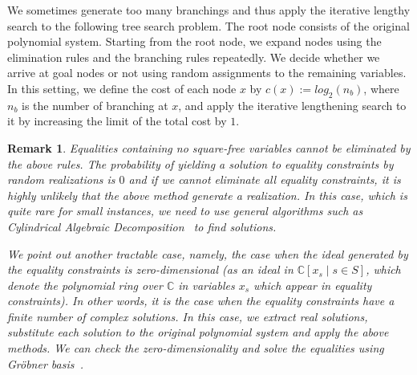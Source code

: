 \documentclass{article}
\newtheorem{remark}[thm]{\bfseries Remark}    %
\begin{document}



We sometimes generate too many branchings and
thus apply the iterative lengthy search to the following tree search problem.
The root node consists of the original polynomial system.
Starting from the root node, we expand nodes using the elimination rules and the branching rules repeatedly.
We decide whether we arrive at goal nodes or not using random assignments to the remaining variables.
In this setting, we define the cost of each node $x$ by $c(x):=log_{2}(n_b)$, where $n_b$ is the number of branching
at $x$, and apply the iterative lengthening search to it by increasing the limit of the total cost by $1$.
\begin{remark}
Equalities containing no square-free variables cannot be eliminated by the above rules.
The probability of yielding a solution to equality constraints by random realizations
is $0$ and if we cannot eliminate all equality constraints, it is highly unlikely 
that the above method generate a realization.
In this case, which is quite rare for small instances,
we need to use general algorithms such as
Cylindrical Algebraic Decomposition~\cite{C75} to find solutions.

We point out another tractable case, namely, the case when the ideal generated by the equality constraints 
is zero-dimensional (as an ideal in $\mathbb{C}[x_s \mid s \in S]$, which denote the polynomial ring over $\mathbb{C}$
in variables $x_s$ which appear in equality constraints).
In other words, it is the case when the equality constraints have a finite number of complex solutions.
In this case, we extract real solutions, substitute each solution to the original polynomial system and apply the above methods.
We can check the zero-dimensionality and solve the equalities using Gr\"obner basis~\cite{CLO92}.
\end{remark}
\end{document}

